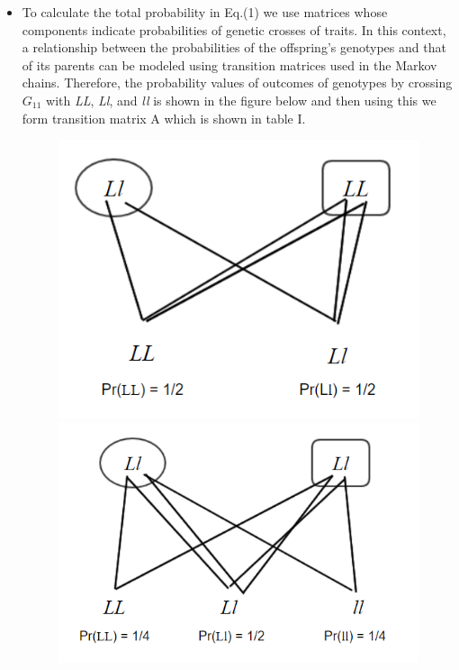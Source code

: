 \documentclass{article}
\begin{document}
\begin{itemize}
    \item To calculate the total probability in Eq.(1) we use matrices whose components indicate probabilities of genetic crosses of traits. In this context, a relationship between the probabilities of the offspring’s genotypes and that of its parents can be modeled using transition matrices used in the Markov chains. Therefore, the probability values of outcomes of genotypes by crossing $ G_{11} $ with \textit{LL}, \textit{Ll}, and \textit{ll} is shown in the figure below and then using this we form transition matrix A which is shown in table I.

    \begin{figure}[h]
    	\centering
    	\begin{minipage}[b]{0.32\textwidth}
    		\includegraphics[width=1.2\textwidth]{a1}    		
    	\end{minipage}%
    	\hspace{3cm}
    	\begin{minipage}[b]{0.32\textwidth}
    		\includegraphics[width=1.3\textwidth]{a3}    	

\end{minipage}
\end{figure}
\end{itemize}
\end{document}
